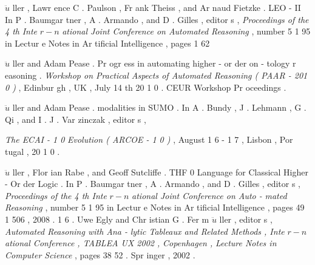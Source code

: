 \documentclass[10pt]{article}
\begin{document}
   $ \ddot{u} $  {\small ller , Lawr ence C . Paulson , Fr ank Theiss , and Ar naud Fietzke . } 
 {\small LEO - II }     
 {\small In P . Baumgar tner , A . Armando , and D . Gilles , editor s , \textit{Proceedings of the 4 th } } 
 {\small \textit{Inte } }  $ r-n $  {\small \textit{ational Joint Conference on Automated Reasoning } , number 5 1 95 in Lectur e } 
 {\small Notes in Ar tificial Intelligence , pages 1 62 }  

   $ \ddot{u} $  {\small ller and Adam Pease . Pr ogr ess in automating higher - or der on - } 
 {\small tology r easoning . }  
 {\small \textit{Workshop on Practical Aspects of Automated Reasoning ( PAAR - 201 0 ) } , Edinbur gh , } 
 {\small UK , July 14 th 20 1 0 . CEUR Workshop Pr oceedings . } 

   $ \ddot{u} $  {\small ller and Adam Pease . }  
 {\small modalities in SUMO . In A . Bundy , J . Lehmann , G . Qi , and I . J . Var zinczak , editor s , } 

{\small \textit{The ECAI - 1 0 } }  
 {\small \textit{Evolution ( ARCOE - 1 0 ) } , August 1 6 - 1 7 , Lisbon , Por tugal , 20 1 0 . } 

   $ \ddot{u} $  {\small ller , Flor ian Rabe , and Geoff Sutcliffe . THF 0 }  
 {\small Language for Classical Higher - Or der Logic . In P . Baumgar tner , A . Armando , and } 
 {\small D . Gilles , editor s , \textit{Proceedings of the 4 th Inte } }  $ r-n $  {\small \textit{ational Joint Conference on Auto - } } 
 {\small \textit{mated Reasoning } , number 5 1 95 in Lectur e Notes in Ar tificial Intelligence , pages } 
 {\small 49 1 506 , 2008 . } 
 {\small 1 6 . }    
 {\small Uwe Egly and Chr istian G . Fer m }  $ \ddot{u} $  {\small ller , editor s , \textit{Automated Reasoning with Ana - } } 
 {\small \textit{lytic Tableaux and Related Methods , Inte } }  $ r-n $  {\small \textit{ational Conference , TABLEA UX 2002 , } } 
 {\small \textit{Copenhagen , } }     
 {\small \textit{Lecture Notes in Computer Science } , pages 38 52 . Spr inger , 2002 . } 
\end{document}
